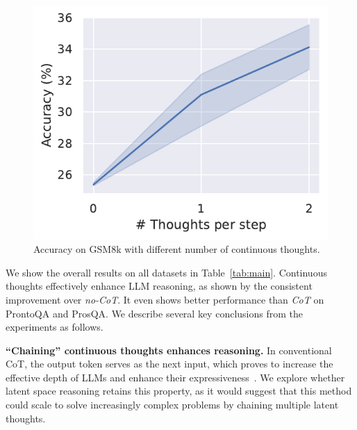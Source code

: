 \documentclass[]{fairmeta}
\begin{document}
\label{sec:result}

\begin{figure}
    \centering
    \vspace{-15pt}
    \includegraphics[width=\linewidth]{figures/n_latent.pdf}
    \vspace{-10pt}
    \caption{Accuracy on GSM8k with different number of continuous thoughts.}
    \vspace{-5pt}
    \label{fig:n_thoughts}
\end{figure}
We show the overall results on all datasets in Table~\ref{tab:main}. Continuous thoughts effectively enhance LLM reasoning, as shown by the consistent improvement over \textit{no-CoT}. It even shows better performance than \textit{CoT} on ProntoQA and ProsQA. We describe several key conclusions from the experiments as follows.



\noindent \textbf{``Chaining'' continuous thoughts enhances reasoning.} In conventional CoT, the output token serves as the next input, which proves to increase the effective depth of LLMs and enhance their expressiveness~\citep{feng2023towards}. We explore whether latent space reasoning retains this property, as it would suggest that this method could scale to solve increasingly complex problems by chaining multiple latent thoughts.
\end{document}
